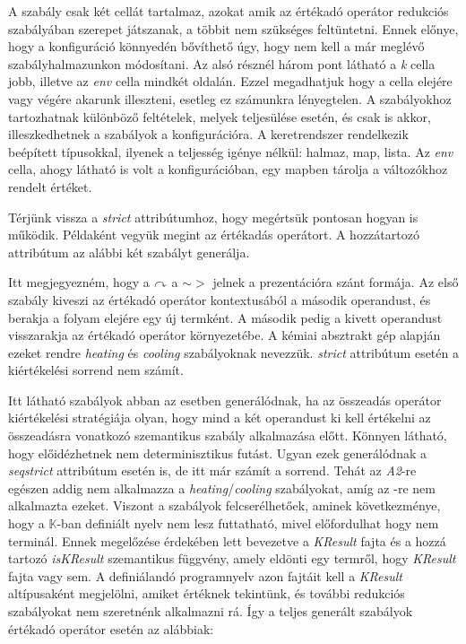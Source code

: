 A szabály csak két cellát tartalmaz, azokat amik az értékadó operátor redukciós szabályában szerepet játszanak, a többit nem szükséges feltüntetni. Ennek előnye, hogy a konfiguráció könnyedén bővíthető úgy, hogy nem kell a már meglévő szabályhalmazunkon módosítani. Az alsó résznél három pont látható a \textit{k} cella jobb, illetve az \textit{env} cella mindkét oldalán. Ezzel megadhatjuk hogy a cella elejére vagy végére akarunk illeszteni, esetleg ez számunkra lényegtelen. A szabályokhoz tartozhatnak különböző feltételek, melyek teljesülése esetén, és csak is akkor, illeszkedhetnek a szabályok a konfigurációra. A keretrendszer rendelkezik beépített típusokkal, ilyenek a teljesség igénye nélkül: halmaz, map, lista. Az \textit{env} cella, ahogy látható is volt a konfigurációban, egy mapben tárolja a változókhoz rendelt értéket.

Térjünk vissza a \textit{strict} attribútumhoz, hogy megértsük pontosan hogyan is működik. Példaként vegyük megint az értékadás operátort. A hozzátartozó attribútum az alábbi két szabályt generálja.



Itt megjegyezném, hogy a $\curvearrowright$ a $\sim>$ jelnek a prezentációra szánt formája. Az első szabály kiveszi az értékadó operátor kontextusából a második operandust, és berakja a folyam elejére egy új termként. A második pedig a kivett operandust visszarakja az értékadó operátor környezetébe. A kémiai absztrakt gép alapján ezeket rendre \textit{heating} és \textit{cooling} szabályoknak nevezzük. \textit{strict} attribútum esetén a kiértékelési sorrend nem számít.



Itt látható szabályok abban az esetben generálódnak, ha az összeadás operátor kiértékelési stratégiája olyan, hogy mind a két operandust ki kell értékelni az összeadásra vonatkozó szemantikus szabály alkalmazása előtt. Könnyen látható, hogy előidézhetnek nem determinisztikus futást. Ugyan ezek generálódnak a \textit{seqstrict} attribútum esetén is, de itt már számít a sorrend. Tehát az \textit{A2}-re egészen addig nem alkalmazza a \textit{heating}/\textit{cooling} szabályokat, amíg az -re nem alkalmazta ezeket. Viszont a szabályok felcserélhetőek, aminek következménye, hogy a $\mathbb{K}$-ban definiált nyelv nem lesz futtatható, mivel előfordulhat hogy nem terminál. Ennek megelőzése érdekében lett bevezetve a \textit{KResult} fajta és a hozzá tartozó \textit{isKResult} szemantikus függvény, amely eldönti egy termről, hogy \textit{KResult} fajta vagy sem. A definiálandó programnyelv azon fajtáit kell a \textit{KResult} altípusaként megjelölni, amiket értéknek tekintünk, és további redukciós szabályokat nem szeretnénk alkalmazni rá. Így a teljes generált szabályok értékadó operátor esetén az alábbiak:


